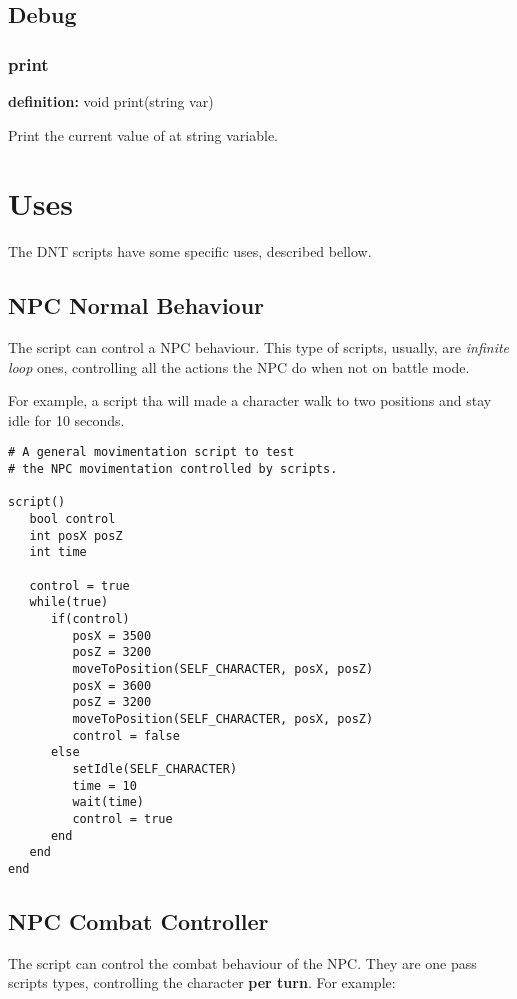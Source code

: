 \documentclass[ letterpaper,12pt]{article}
\begin{document}
\subsection{Debug}

\subsubsection{print}
{\bf definition:} void print(string var)

Print the current value of at string variable.

\section{Uses}

The DNT scripts have some specific uses, described bellow.

\subsection{NPC Normal Behaviour}

The script can control a NPC behaviour. This type of scripts, usually, are
{\it infinite loop} ones, controlling all the actions the NPC do when not on
battle mode.

For example, a script tha will made a character walk to two positions and stay
idle for 10 seconds.

\begin{verbatim}
# A general movimentation script to test
# the NPC movimentation controlled by scripts.

script()
   bool control
   int posX posZ
   int time

   control = true
   while(true)
      if(control)
         posX = 3500
         posZ = 3200
         moveToPosition(SELF_CHARACTER, posX, posZ)
         posX = 3600
         posZ = 3200
         moveToPosition(SELF_CHARACTER, posX, posZ)
         control = false
      else
         setIdle(SELF_CHARACTER)
         time = 10
         wait(time)
         control = true
      end
   end
end
\end{verbatim}

\subsection{NPC Combat Controller}
The script can control the combat behaviour of the NPC. They are one pass
scripts types, controlling the character {\bf per turn}. For example:
\end{document}
